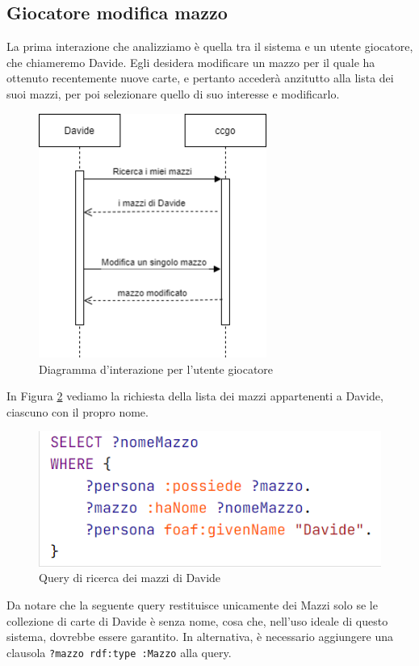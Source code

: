 \documentclass[12pt]{article}
\begin{document}
\subsection{Giocatore modifica mazzo}
La prima interazione che analizziamo è quella tra il sistema e un utente giocatore, che chiameremo Davide. Egli desidera modificare un mazzo per il quale ha ottenuto recentemente nuove carte, e pertanto accederà anzitutto alla lista dei suoi mazzi, per poi selezionare quello di suo interesse e modificarlo.

\begin{figure}[H]
    \centering
    \includegraphics[height=8cm]{files/flowchart_davide.png}
    \caption{Diagramma d'interazione per l'utente giocatore}
    \label{fig:flowchart_davide}
\end{figure}

In Figura \ref{fig:query1_davide} vediamo la richiesta della lista dei mazzi appartenenti a Davide, ciascuno con il propro nome.

\begin{figure}[H]
    \centering
    \includegraphics[]{files/query1_davide.png}
    \caption{Query di ricerca dei mazzi di Davide}
    \label{fig:query1_davide}
\end{figure}

Da notare che la seguente query restituisce unicamente dei Mazzi solo se le collezione di carte di Davide è senza nome, cosa che, nell'uso ideale di questo sistema, dovrebbe essere garantito. In alternativa, è necessario aggiungere una clausola \texttt{?mazzo rdf:type :Mazzo} alla query.
\end{document}
